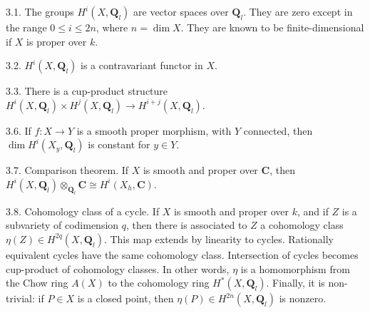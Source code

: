3.1. The groups $H^i(X, \mathbf{Q}_l)$ are vector spaces over $\mathbf{Q}_l$. They are zero except in the range $0 \leqslant i \leqslant 2n$, where $n = \dim X$. They are known to be finite-dimensional if $X$ is proper over $k$.

3.2. $H^i(X, \mathbf{Q}_l)$ is a contravariant functor in $X$.

3.3. There is a cup-product structure $H^i(X, \mathbf{Q}_l) \times H^j(X, \mathbf{Q}_l) \rightarrow H^{i+j}(X, \mathbf{Q}_l)$.

3.6. If $f: X \rightarrow Y$ is a smooth proper morphism, with $Y$ connected, then $\dim H^i(X_y, \mathbf{Q}_l)$ is constant for $y \in Y$.

3.7. Comparison theorem. If $X$ is smooth and proper over $\mathbf{C}$, then $H^i(X, \mathbf{Q}_l) \otimes_{\mathbf{Q}_l} \mathbf{C} \cong H^i(X_h, \mathbf{C})$.

3.8. Cohomology class of a cycle. If $X$ is smooth and proper over $k$, and if $Z$ is a subvariety of codimension $q$, then there is associated to $Z$ a cohomology class $\eta(Z) \in H^{2q}(X, \mathbf{Q}_l)$. This map extends by linearity to cycles. Rationally equivalent cycles have the same cohomology class. Intersection of cycles becomes cup-product of cohomology classes. In other words, $\eta$ is a homomorphism from the Chow ring $A(X)$ to the cohomology ring $H^*(X, \mathbf{Q}_l)$. Finally, it is non-trivial: if $P \in X$ is a closed point, then $\eta(P) \in H^{2n}(X, \mathbf{Q}_l)$ is nonzero.